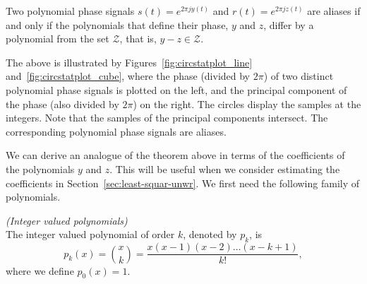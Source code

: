\documentclass[journal]{IEEEtran}
\begin{document}
\begin{lemma}\label{lem:circpolysampledthm}
Two polynomial phase signals $s(t) = e^{2\pi j y(t)}$  and $r(t) = e^{2\pi j z(t)}$  are aliases if and only if the polynomials that define their phase, $y$ and $z$, differ by a polynomial from the set $\mathcal{Z}$, that is, $y - z \in \mathcal{Z}$.
\end{lemma}



The above is illustrated by Figures~\ref{fig:circstatplot_line} and~\ref{fig:circstatplot_cube}, where the phase (divided by $2\pi$) of two distinct polynomial phase signals is plotted on the left, and the principal component of the phase (also divided by $2\pi$) on the right. The circles display the samples at the integers. Note that the samples of the principal components intersect.  The corresponding polynomial phase signals are aliases.

We can derive an analogue of the theorem above in terms of the coefficients of the polynomials $y$ and $z$. This will be useful when we consider estimating the coefficients in Section~\ref{sec:least-squar-unwr}.  We first need the following family of polynomials. 

\begin{definition} \emph{(Integer valued polynomials)} \label{def:intvaledpolys}
\\The integer valued polynomial of order $k$, denoted by $p_k$, is
\[
p_k(x) = \binom{x}{k} = \frac{x(x-1)(x-2)\dots(x-k+1)}{k!},
\]
where we define $p_0(x) = 1$.
\end{definition}
\end{document}
